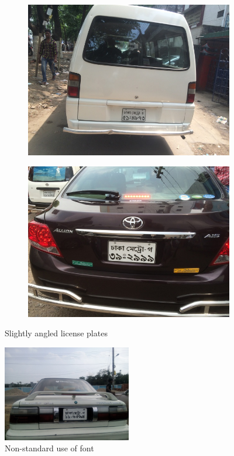 \documentclass{standalone}
\begin{document}
\begin{figure}
\begin{subfigure}{0.5\textwidth}
    \centering
    \includegraphics[width=0.9\linewidth]{./img/experiment/stage.1/angle}
\end{subfigure}
\begin{subfigure}{0.5\textwidth}
    \centering
    \includegraphics[width=0.9\linewidth]{./img/experiment/stage.1/angle3}
\end{subfigure}
\caption{Slightly angled license plates}
\end{figure}

\begin{figure}
    \centering
    \includegraphics[width=0.5\textwidth]{./img/experiment/stage.1/badfont}
    \caption{Non-standard use of font}
\end{figure}
\end{document}
